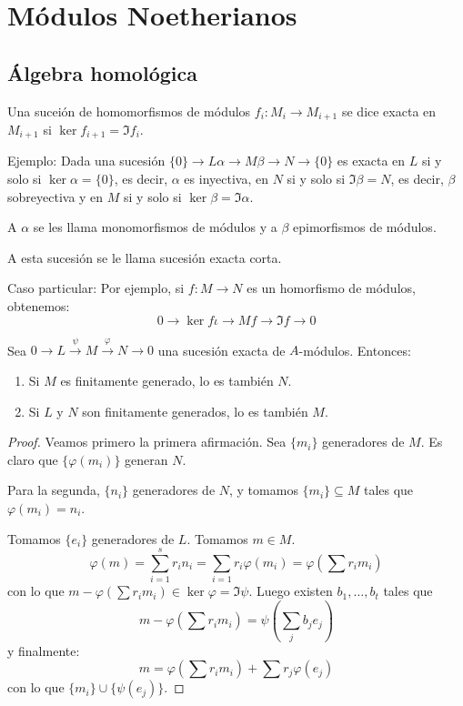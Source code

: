 \section{Módulos Noetherianos}
\subsection{Álgebra homológica}

\begin{df}
  Una suceión de homomorfismos de módulos \(f_i:M_i\longrightarrow
  M_{i+1}\) se dice exacta en
  \(M_{i+1}\) si \(\ker f_{i+1}=\Im f_i\).
\end{df}

Ejemplo: Dada una sucesión \(\{0\}\longrightarrow L \alpha
\longrightarrow M \beta\longrightarrow N\longrightarrow \{0\}\)
es exacta en \(L\) si y solo si \(\ker \alpha=\{0\}\), es decir,
\(\alpha\) es inyectiva, en \(N\) si y solo si \(\Im \beta = N\),
es decir, \(\beta\) sobreyectiva y en \(M\) si y solo si
\(\ker\beta=\Im\alpha\).

A \(\alpha\) se les llama monomorfismos de módulos y a
\(\beta\) epimorfismos de módulos.

A esta sucesión se le llama sucesión exacta corta.

Caso particular: Por ejemplo, si \(f:M\longrightarrow N\) es
un homorfismo de módulos, obtenemos:
\[
  0\longrightarrow\ker f\iota\longrightarrow M f\longrightarrow\Im f
  \longrightarrow 0
\]

\begin{prop}
  Sea \(0\longrightarrow L\overset{\psi}{\longrightarrow} M
  \overset{\varphi}{\longrightarrow}
  N\longrightarrow 0\) una sucesión exacta de \(A\)-módulos. Entonces:
  \begin{enumerate}
    \item Si \(M\) es finitamente generado, lo es también \(N\).
    \item Si \(L\) y \(N\) son finitamente generados, lo es también \(M\).
  \end{enumerate}
\end{prop}

\begin{proof}
  Veamos primero la primera afirmación. Sea \(\{m_i\}\) generadores de \(M\).
  Es claro que \(\{\varphi(m_i)\}\) generan \(N\).

  Para la segunda, \(\{n_i\}\) generadores de \(N\), y tomamos
  \(\{m_i\}\subseteq M\) tales que \(\varphi(m_i)= n_i\).

  Tomamos \(\{e_i\}\) generadores de \(L\). Tomamos \(m\in M\).
  \[
    \varphi(m)=\sum_{i=1}^s r_i n_i = \sum_{i=1} r_i\varphi(m_i)
    =\varphi\left(\sum r_i m_i\right)
  \]
  con lo que \(m-\varphi(\sum r_i m_i)\in\ker\varphi=\Im\psi\).
  Luego existen \(b_1,\ldots, b_t\) tales que
  \[
    m-\varphi\left(\sum r_i m_i\right)=
    \psi\left(\sum_j b_j e_j\right)
  \]
  y finalmente:
  \[
    m=\varphi\left(\sum r_i m_i\right)+\sum r_j \varphi(e_j)
  \]
  con lo que \(\{m_i\}\cup\{\psi(e_j)\}\).
\end{proof}

